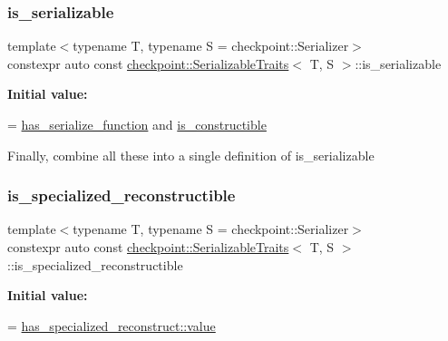 \subsubsection{\texorpdfstring{is\+\_\+serializable}{is\_serializable}}
{\footnotesize\ttfamily template$<$typename T, typename S = checkpoint\+::\+Serializer$>$ \\
constexpr auto const \hyperlink{structcheckpoint_1_1_serializable_traits}{checkpoint\+::\+Serializable\+Traits}$<$ T, S $>$\+::is\+\_\+serializable\hspace{0.3cm}{\ttfamily [static]}}

{\bfseries Initial value\+:}
\begin{DoxyCode}
=
    \hyperlink{structcheckpoint_1_1_serializable_traits_a4d17a7627a8e033cccb5cf4e6b8fd0dc}{has\_serialize\_function} and \hyperlink{structcheckpoint_1_1_serializable_traits_a7720e2f57d1b3d2f87fd022b47d0b775}{is\_constructible}
\end{DoxyCode}
Finally, combine all these into a single definition of is\+\_\+serializable \mbox{\label{structcheckpoint_1_1_serializable_traits_a305317a4e8fb44498f195a39bf59ad2d}} 
\subsubsection{\texorpdfstring{is\+\_\+specialized\+\_\+reconstructible}{is\_specialized\_reconstructible}}
{\footnotesize\ttfamily template$<$typename T, typename S = checkpoint\+::\+Serializer$>$ \\
constexpr auto const \hyperlink{structcheckpoint_1_1_serializable_traits}{checkpoint\+::\+Serializable\+Traits}$<$ T, S $>$\+::is\+\_\+specialized\+\_\+reconstructible\hspace{0.3cm}{\ttfamily [static]}}

{\bfseries Initial value\+:}
\begin{DoxyCode}
=
    \hyperlink{structdetection_1_1detector_a6d7d0e1bdf5903db9edbe448edccf83b}{has\_specialized\_reconstruct::value}
\end{DoxyCode}
\mbox{\label{structcheckpoint_1_1_serializable_traits_aa6618d9f36e37127006112c73755fceb}} 
